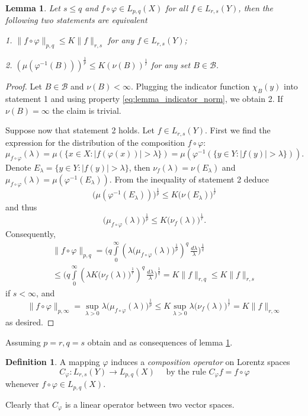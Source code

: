 \documentclass{birkjour}
\newtheorem{lem}[thm]{Lemma}
\theoremstyle{definition}
\newtheorem{defn}[thm]{Definition}
\theoremstyle{remark}
\numberwithin{equation}{section}
\begin{document}
\begin{lem}\label{lemma:principal}
Let $s\leq q$ and $f\circ\varphi \in L_{p,q}(X)$ for all $f\in L_{r,s}(Y)$,
then the following two statements are equivalent 

1. $\|f\circ\varphi\|_{p,q}\leq K\|f\|_{r,s}$ for any $f\in L_{r,s}(Y)$;

2. $(\mu(\varphi^{-1}(B)))^{\frac{1}{p}} \leq K(\nu(B))^{\frac{1}{r}}$ for any set $B\in\mathcal B$.
\end{lem}
\begin{proof}
Let $B\in\mathcal B$ and $\nu(B)<\infty$.
Plugging the indicator function $\chi_B(y)$ 
into statement 1  
and using property \eqref{eq:lemma_indicator_norm}, 
we obtain 2. 
If $\nu(B)=\infty$ the claim is trivial.

Suppose now that statement 2 holds. 
Let $f\in L_{r,s}(Y)$. 
First we find the expression for the distribution of the composition $f\circ\varphi$:
$$
\mu_{f\circ\varphi}(\lambda) = \mu(\{x\in X : |f(\varphi(x))|>\lambda\})
=\mu(\varphi^{-1}(\{y\in Y : |f(y)|>\lambda\})).
$$
Denote $E_\lambda = \{y\in Y : |f(y)|>\lambda\}$, then $\nu_f(\lambda) = \nu(E_\lambda)$
and $\mu_{f\circ\varphi}(\lambda) = \mu(\varphi^{-1}(E_\lambda))$.
From the inequality of statement 2 deduce
$$
\big(\mu(\varphi^{-1}(E_\lambda))\big)^{\frac{1}{p}} \leq K\big(\nu(E_\lambda)\big)^{\frac{1}{r}} 
$$
and thus
$$
\big(\mu_{f\circ\varphi}(\lambda)\big)^{\frac{1}{p}} \leq K\big(\nu_f(\lambda)\big)^{\frac{1}{r}}.
$$
Consequently,
\begin{multline*}
\|f\circ\varphi\|_{p,q}
= \Bigg(q\int\limits_{0}^{\infty}\left(\lambda\big(\mu_{f\circ\varphi}(\lambda)\big)^{\frac{1}{p}}\right)^q
\,\frac{d\lambda}{\lambda}\Bigg)^{\frac{1}{q}}\\
\leq
\Bigg(q\int\limits_{0}^{\infty}\left(\lambda K\big(\nu_{f}(\lambda)\big)^{\frac{1}{r}}\right)^q
\,\frac{d\lambda}{\lambda}\Bigg)^{\frac{1}{q}}
=K\|f\|_{r,q} \leq K\|f\|_{r,s}
\end{multline*}
if $s<\infty$, and
$$
\|f\circ\varphi\|_{p,\infty} 
= \sup\limits_{\lambda>0}\lambda\big(\mu_{f\circ\varphi}(\lambda)\big)^{\frac{1}{p}}
\leq K\sup\limits_{\lambda>0}\lambda\big(\nu_{f}(\lambda)\big)^{\frac{1}{r}}
= K\|f\|_{r,\infty}
$$
as desired. 
\end{proof}
Assuming $p=r, q=s$ obtain \cite[Theorem 1]{KK} and \cite[Theorem 2.1]{ADV} as consequences
of lemma \ref{lemma:principal}.


\begin{defn} 
A mapping $\varphi$ induces a \textit{composition operator} on Lorentz spaces
\begin{equation}\label{composition_operator}
C_\varphi:L_{r,s}(Y)\to L_{p,q}(X) \quad \text{ by the rule } C_\varphi f = f\circ\varphi
\end{equation}
whenever $f\circ\varphi\in L_{p,q}(X)$. 
\end{defn}
Clearly that $C_\varphi$ is a linear operator between two vector spaces.
\end{document}
